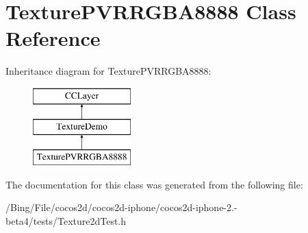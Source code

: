 \hypertarget{interface_texture_p_v_r_r_g_b_a8888}{\section{Texture\-P\-V\-R\-R\-G\-B\-A8888 Class Reference}
\label{interface_texture_p_v_r_r_g_b_a8888}
}
Inheritance diagram for Texture\-P\-V\-R\-R\-G\-B\-A8888\-:\begin{figure}[H]
\begin{center}
\leavevmode
\includegraphics[height=3.000000cm]{interface_texture_p_v_r_r_g_b_a8888}
\end{center}
\end{figure}


The documentation for this class was generated from the following file\-:\begin{DoxyCompactItemize}
\item 
/\-Bing/\-File/cocos2d/cocos2d-\/iphone/cocos2d-\/iphone-\/2.-\/beta4/tests/Texture2d\-Test.\-h\end{DoxyCompactItemize}
